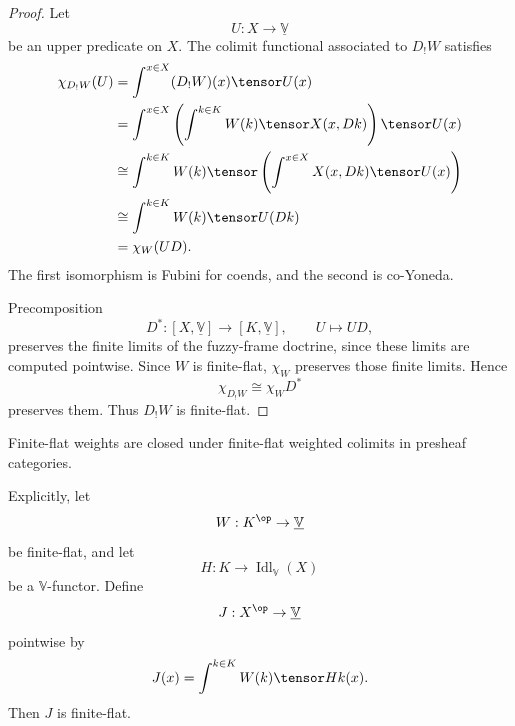 \begin{proof}
Let
\[
    U:X\to\underline{\mathbb V}
\]
be an upper predicate on \(X\).  The colimit functional associated to \(D_!W\)
satisfies
\[
\begin{aligned}
    \chi_{D_!W}(U)
    &=
    \int^{x\in X}(D_!W)(x)\tensor U(x)
    \\
    &=
    \int^{x\in X}
        \left(
            \int^{k\in K}W(k)\tensor X(x,Dk)
        \right)\tensor U(x)
    \\
    &\cong
    \int^{k\in K}
        W(k)\tensor
        \left(
            \int^{x\in X}X(x,Dk)\tensor U(x)
        \right)
    \\
    &\cong
    \int^{k\in K}W(k)\tensor U(Dk)
    \\
    &=
    \chi_W(UD).
\end{aligned}
\]
The first isomorphism is Fubini for coends, and the second is co-Yoneda.

Precomposition
\[
    D^*:[X,\underline{\mathbb V}]\to[K,\underline{\mathbb V}],
    \qquad
    U\longmapsto UD,
\]
preserves the finite limits of the fuzzy-frame doctrine, since these limits are
computed pointwise.  Since \(W\) is finite-flat, \(\chi_W\) preserves those
finite limits.  Hence
\[
    \chi_{D_!W}
    \cong
    \chi_WD^*
\]
preserves them.  Thus \(D_!W\) is finite-flat.
\end{proof}

\begin{proposition}
\label{prop:finite-flat-saturation-fdom-rewrite}
Finite-flat weights are closed under finite-flat weighted colimits in presheaf
categories.

Explicitly, let
\[
    W:K^{\op}\to\underline{\mathbb V}
\]
be finite-flat, and let
\[
    H:K\to\operatorname{Idl}_{\mathbb V}(X)
\]
be a \(\mathbb V\)-functor.  Define
\[
    J:X^{\op}\to\underline{\mathbb V}
\]
pointwise by
\[
    J(x)
    =
    \int^{k\in K} W(k)\tensor Hk(x).
\]
Then \(J\) is finite-flat.
\end{proposition}


